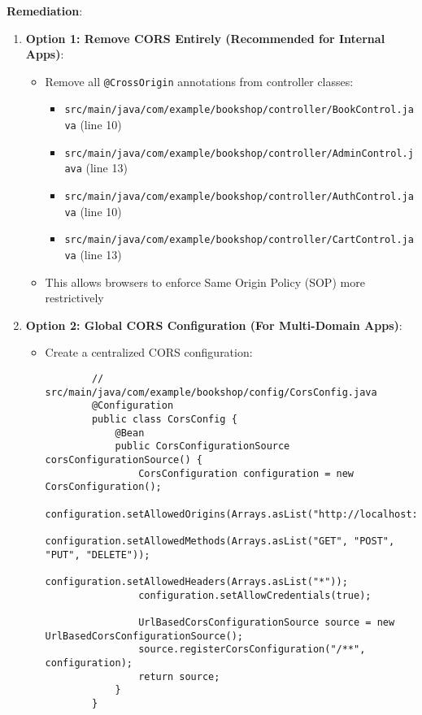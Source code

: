 \documentclass[]{UCD_CS_FYP_Report}
\begin{document}
\textbf{Remediation}:
\begin{enumerate}
    \item \textbf{Option 1: Remove CORS Entirely (Recommended for Internal Apps)}:
    \begin{itemize}
        \item Remove all \texttt{@CrossOrigin} annotations from controller classes:
        \begin{itemize}
            \item \texttt{src/main/java/com/example/bookshop/controller/BookControl.java} (line 10)
            \item \texttt{src/main/java/com/example/bookshop/controller/AdminControl.java} (line 13)
            \item \texttt{src/main/java/com/example/bookshop/controller/AuthControl.java} (line 10)
            \item \texttt{src/main/java/com/example/bookshop/controller/CartControl.java} (line 13)
        \end{itemize}
        \item This allows browsers to enforce Same Origin Policy (SOP) more restrictively
    \end{itemize}
    
    \item \textbf{Option 2: Global CORS Configuration (For Multi-Domain Apps)}:
    \begin{itemize}
        \item Create a centralized CORS configuration:
        \begin{verbatim}
        // src/main/java/com/example/bookshop/config/CorsConfig.java
        @Configuration
        public class CorsConfig {
            @Bean
            public CorsConfigurationSource corsConfigurationSource() {
                CorsConfiguration configuration = new CorsConfiguration();
                configuration.setAllowedOrigins(Arrays.asList("http://localhost:3000"));
                configuration.setAllowedMethods(Arrays.asList("GET", "POST", "PUT", "DELETE"));
                configuration.setAllowedHeaders(Arrays.asList("*"));
                configuration.setAllowCredentials(true);
                
                UrlBasedCorsConfigurationSource source = new UrlBasedCorsConfigurationSource();
                source.registerCorsConfiguration("/**", configuration);
                return source;
            }
        }
        \end{verbatim}
        

\end{itemize}
\end{enumerate}
\end{document}
